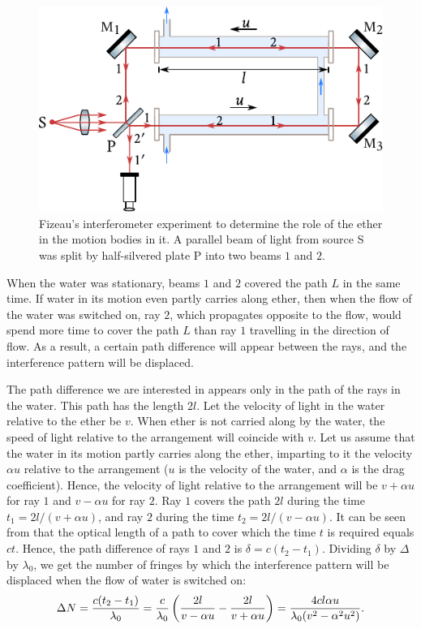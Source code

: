 \begin{figure}[t]
	\begin{center}
		\includegraphics[scale=1]{figures/ch_21/fig_21_3.pdf}
        \caption[]{Fizeau's interferometer experiment to determine the role of the ether in the motion bodies in it. A parallel beam of light from source S was split by half-silvered plate P into two beams $1$ and $2$.}
		\label{fig:21_3}
	\end{center}
	\vspace{-0.8cm}
\end{figure}

When the water was stationary, beams $1$ and $2$ covered the path $L$ in the same time.
If water in its motion even partly carries along ether, then when the flow of the water was switched on, ray $2$, which propagates opposite to the flow, would spend more time to cover the path $L$ than ray $1$ travelling in the direction of flow.
As a result, a certain path difference will appear between the rays, and the interference pattern will be displaced.

The path difference we are interested in appears only in the path of the rays in the water.
This path has the length $2l$.
Let the velocity of light in the water relative to the ether be $v$.
When ether is not carried along by the water, the speed of light relative to the arrangement will coincide with $v$.
Let us assume that the water in its motion partly carries along the ether, imparting to it the velocity $\alpha u$ relative to the arrangement ($u$ is the velocity of the water, and $\alpha$ is the drag coefficient).
Hence, the velocity of light relative to the arrangement will be $v+\alpha u$ for ray $1$ and $v-\alpha u$ for ray $2$.
Ray $1$ covers the path $2l$ during the time $t_1=2l/(v+\alpha u)$, and ray $2$ during the time $t_2=2l/(v-\alpha u)$.
It can be seen from  that the optical length of a path to cover which the time $t$ is required equals $ct$.
Hence, the path difference of rays $1$ and $2$ is $\delta=c(t_2-t_1)$.
Dividing $\delta$ by $\Delta$ by $\lambda_0$, we get the number of fringes by which the interference pattern will be displaced when the flow of water is switched on:
\begin{equation*}
	\Delta{N} = \frac{c(t_2-t_1)}{\lambda_0} = \frac{c}{\lambda_0} \left(\frac{2l}{v-\alpha u} - \frac{2l}{v+\alpha u}\right) = \frac{4cl\alpha u}{\lambda_0 (v^2 - \alpha^2 u^2)}.
\end{equation*}

